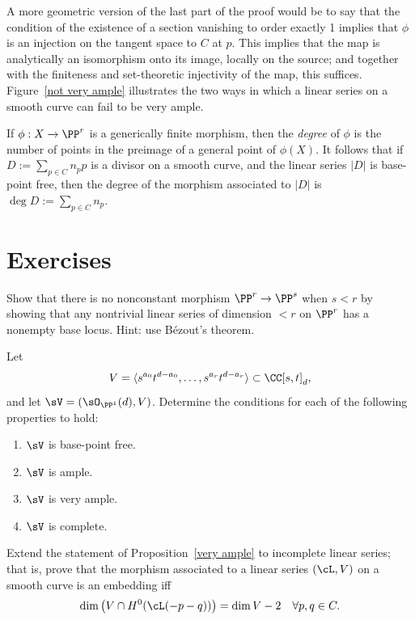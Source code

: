A more geometric version of the last part of the proof would be to say that the condition of the existence of a section
vanishing to order exactly 1 implies that $\phi$ is an injection on the tangent space to $C$ at $p$. This implies that
the map is analytically an isomorphism onto its image, locally on the source;
 and together with the finiteness and set-theoretic injectivity of the map, this suffices. Figure~\ref{not very ample} illustrates
 the two ways in which a linear series on a smooth curve can fail to be very ample.

If $\phi:X \to \PP^r$ is a generically finite morphism, then the
\emph{degree} of $\phi$ is the number of points in the preimage of a
general point of $\phi(X)$. It follows that if $D := \sum_{p\in C}
n_pp$ is a divisor on a smooth curve, and the linear series $|D|$ is
base-point free, then the degree of the morphism associated to $|D|$
is $\deg D := \sum_{p\in C} n_p$.
{\meshing\par}

\section*{Exercises}

\begin{exercise}\label{here there be basepoints}
 Show that there is no nonconstant morphism $\PP^r\to \PP^s$ when $s<r$ by showing that any nontrivial linear
 series of dimension $<r$ on $\PP^r$ has a nonempty base locus. Hint: use B\'ezout's theorem.
\end{exercise}

\begin{exercise}
Let 
$$
V = \langle s^{a_0}t^{d-a_0}, \dots, s^{a_r}t^{d-a_r}\rangle \subset \CC[s,t]_d,
$$
and let $\sV = (\sO_{\PP^1}(d), V)$. Determine the conditions for
each of the following properties to hold:
\begin{enumerate}
 \item $\sV$ is base-point free.
 \item $\sV$ is ample.
 \item $\sV$ is very ample.
 \item $\sV$ is complete.
\end{enumerate}
\end{exercise}

\begin{exercise}
Extend the statement of Proposition~\ref{very ample} to incomplete linear series; that is, prove that the morphism associated to a linear series $(\cL, V)$
on a smooth curve is an embedding iff
$$
\dim\big( V \cap H^0(\cL(-p-q))\big) = \dim V - 2 \quad \forall p, q \in C.
$$
\end{exercise}

